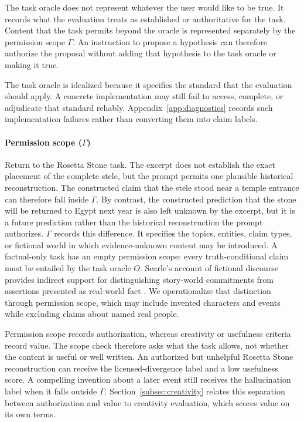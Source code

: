 \documentclass{clv2025}
\begin{document}
The task oracle does not represent whatever the user would like to be true.
It records what the evaluation treats as established or authoritative for the
task.
Content that the task permits beyond the oracle is represented separately by
the permission scope $\Gamma$.
An instruction to propose a hypothesis can therefore authorize the proposal
without adding that hypothesis to the task oracle or making it true.

The task oracle is idealized because it specifies the standard that the
evaluation should apply.
A concrete implementation may still fail to access, complete, or adjudicate
that standard reliably.
Appendix~\ref{app:diagnostics} records such implementation failures rather than
converting them into claim labels.

\paragraph{Permission scope ($\Gamma$)}
Return to the Rosetta Stone task. The excerpt does not establish the exact
placement of the complete stele, but the prompt permits one plausible
historical reconstruction. The constructed claim that the stele stood near a
temple entrance can therefore fall inside $\Gamma$. By contrast, the
constructed prediction that the stone will be returned to Egypt next year is
also left unknown by the excerpt, but it is a future prediction rather than the
historical reconstruction the prompt authorizes. $\Gamma$ records this
difference. It specifies the topics,
entities, claim types, or fictional world in which evidence-unknown content may
be introduced.
A factual-only task has an empty permission scope: every truth-conditional
claim must be entailed by the task oracle $O$.
Searle's account of fictional discourse provides indirect support for
distinguishing story-world commitments from assertions presented as
real-world fact \citep{searle_logical_1975}.
We operationalize that distinction through permission scope, which may
include invented characters and events while excluding claims about named
real people.

Permission scope records authorization, whereas creativity or usefulness
criteria record value. The scope check therefore asks what the task allows, not
whether the content is useful or well written. An authorized but unhelpful
Rosetta Stone reconstruction can receive the licensed-divergence label and a
low usefulness score. A compelling invention about a later event still
receives the hallucination label when it falls outside $\Gamma$.
Section~\ref{subsec:creativity} relates this separation between authorization
and value to creativity evaluation, which scores value on its own terms.
\end{document}
